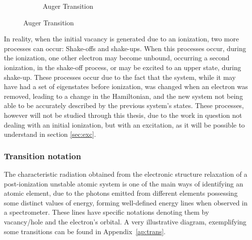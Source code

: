 \begin{figure}[h!]
\begin{subfigure}{0.49\textwidth}
        \caption{Auger Transition}
    \end{subfigure}
\end{figure}

In reality, when the initial vacancy is generated due to an ionization, two more processes can occur: Shake-offs and shake-ups. When this processes occur, during the ionization, one other electron may become unbound, occurring a second ionization, in the shake-off process, or may be excited to an upper state, during shake-up.
These processes occur due to the fact that the system, while it may have had a set of eigenstates before ionization, was changed when an electron was removed, leading to a change in the Hamiltonian, and the new system not being able to be accurately described by the previous system's states.  
These processes, however will not be studied through this thesis, due to the work in question not dealing with an initial ionization, but with an excitation, as it will be possible to understand in section \ref{sec:exc}.


\subsubsection{Transition notation}

The characteristic radiation obtained from the electronic structure relaxation of a post-ionization unstable atomic system is one of the main ways of identifying an atomic element, due to the photons emitted from different elements possessing some distinct values of energy, forming well-defined energy lines when observed in a spectrometer. These lines have specific notations denoting them by vacancy/hole and the electron's orbital.
A very illustrative diagram, exemplifying some transitions can be found in Appendix~\ref{ap:trans}.

